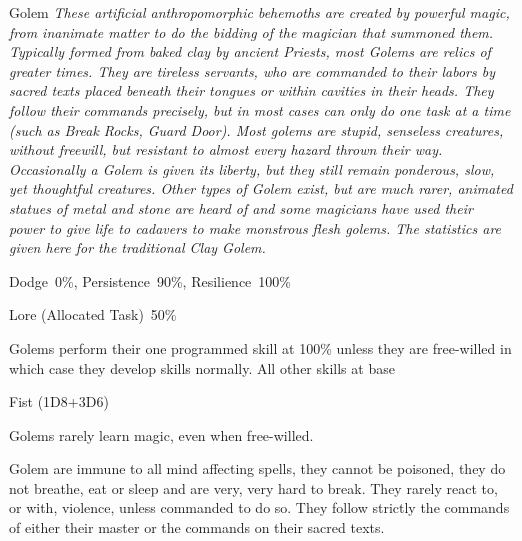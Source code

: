 \newpage

\begin{monsterbox}{Golem}
	\textit{These artificial anthropomorphic behemoths are created by powerful magic, from inanimate matter to do the bidding of the magician that summoned them. Typically formed from baked clay by ancient Priests, most Golems are relics of greater times. They are tireless servants, who are commanded to their labors by sacred texts placed beneath their tongues or within cavities in their heads. They follow their commands precisely, but in most cases can only do one task at a time (such as Break Rocks, Guard Door). Most golems are stupid, senseless creatures, without freewill, but resistant to almost every hazard thrown their way. Occasionally a Golem is given its liberty, but they still remain ponderous, slow, yet thoughtful creatures. Other types of Golem exist, but are much rarer, animated statues of metal and stone are heard of and some magicians have used their power to give life to cadavers to make monstrous flesh golems. The statistics are given here for the traditional Clay Golem.}\\
	\rpghline
	\basics[%
        hitpoints  = 29
	majorwound = 15,
	damagemodifier = +3D6,
	powerpoints = 4/11 (free willed),
	movementrate = 15m (cannot run),
	armor = Clay Body (8AP or 4AP against crushing weapons),
	plunderrating = 0
	]
	\rpghline%
	\stats[ %
		STR = 6D6+18 (39),
		CON = 3D6+18 (29),
		DEX = 2D6    (7),
		SIZ = 3D6+18 (29),
		INT = 1D6/2D6 (4/7),
		POW = 1D6/3D6 (4/11),
		CHA = 1D6/2D6 (4/7)
	]
	\rpghline%
	\begin{rpg-monsteraction}[Resistances]
		Dodge~0\%, Persistence~90\%, Resilience~100\%
	\end{rpg-monsteraction}
	\begin{rpg-monsteraction}[Knowledge]
		Lore (Allocated Task)~50\%
	\end{rpg-monsteraction}
	\begin{rpg-monsteraction}[Practical]
		Golems perform their one programmed skill at 100\% unless they are free-willed in which case they develop skills normally. All other skills at base %
	\end{rpg-monsteraction}
	\begin{rpg-monsteraction}
		Fist (1D8+3D6)
	\end{rpg-monsteraction}
	\begin{rpg-monsteraction}[Magic]
		Golems rarely learn magic, even when free-willed.
	\end{rpg-monsteraction}
	\begin{rpg-monsteraction}
		Golem are immune to all mind affecting spells, they cannot be poisoned, they do not breathe, eat or sleep and are very, very hard to break. They rarely react to, or with, violence, unless commanded to do so. They follow strictly the commands of either their master or the commands on their sacred texts.
	\end{rpg-monsteraction}

\end{monsterbox}


